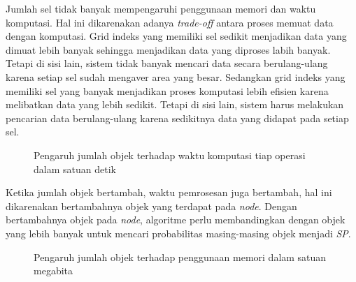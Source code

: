 \documentclass[conference]{IEEEtran}
\begin{document}
Jumlah sel tidak banyak mempengaruhi penggunaan memori dan waktu komputasi. Hal ini dikarenakan adanya \textit{trade-off} antara proses memuat data dengan komputasi. Grid indeks yang memiliki sel sedikit menjadikan data yang dimuat lebih banyak sehingga menjadikan data yang diproses labih banyak. Tetapi di sisi lain, sistem tidak banyak mencari data secara berulang-ulang karena setiap sel sudah mengaver area yang besar. Sedangkan grid indeks yang memiliki sel yang banyak menjadikan proses komputasi lebih efisien karena melibatkan data yang lebih sedikit. Tetapi di sisi lain, sistem harus melakukan pencarian data berulang-ulang karena sedikitnya data yang didapat pada setiap sel.

\begin{figure}
	\centering
	\caption{Pengaruh jumlah objek terhadap waktu komputasi tiap operasi dalam satuan detik}\label{fig:uji-n}
\end{figure}

Ketika jumlah objek bertambah, waktu pemrosesan juga bertambah, hal ini dikarenakan bertambahnya objek yang terdapat pada \textit{node}. Dengan bertambahnya objek pada \textit{node}, algoritme perlu membandingkan dengan objek yang lebih banyak untuk mencari probabilitas masing-masing objek menjadi \textit{SP}.

\begin{figure}
	\centering
	\caption{Pengaruh jumlah objek terhadap penggunaan memori dalam satuan megabita}\label{fig:uji-n-mem}
\end{figure}
\end{document}
